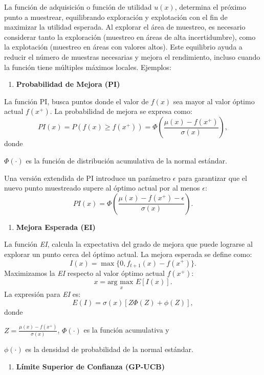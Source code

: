 \documentclass[
  12pt,
  letterpaper,
  DIV=11,
  numbers=noendperiod]{scrartcl}
\providecommand{\tightlist}{%
  \setlength{\itemsep}{0pt}\setlength{\parskip}{0pt}}\usepackage{longtable,booktabs,array}
\begin{document}
La función de adquisición o función de utilidad \(u(x)\), determina el
próximo punto a muestrear, equilibrando exploración y explotación con el
fin de maximizar la utilidad esperada. Al explorar el área de muestreo,
es necesario considerar tanto la exploración (muestreo en áreas de alta
incertidumbre), como la explotación (muestreo en áreas con valores
altos). Este equilibrio ayuda a reducir el número de muestras necesarias
y mejora el rendimiento, incluso cuando la función tiene múltiples
máximos locales. Ejemplos:

\newpage

\begin{enumerate}
\def\labelenumi{\arabic{enumi}.}
\tightlist
\item
  \textbf{Probabilidad de Mejora (PI)}
\end{enumerate}

La función PI, busca puntos donde el valor de \(f(x)\) sea mayor al
valor óptimo actual \(f(x^+)\). La probabilidad de mejora se expresa
como: \[
PI(x) = P(f(x) \geq f(x^+)) = \Phi\left(\frac{\mu(x) - f(x^+)}{\sigma(x)}\right),
\] donde

\(\Phi(\cdot)\) es la función de distribución acumulativa de la normal
estándar.

Una versión extendida de PI introduce un parámetro \(\epsilon\) para
garantizar que el nuevo punto muestreado supere al óptimo actual por al
menos \(\epsilon\): \[
PI(x) = \Phi\left(\frac{\mu(x) - f(x^+) - \epsilon}{\sigma(x)}\right).
\]

\begin{enumerate}
\def\labelenumi{\arabic{enumi}.}
\setcounter{enumi}{1}
\tightlist
\item
  \textbf{Mejora Esperada (EI)}
\end{enumerate}

La función \emph{EI}, calcula la expectativa del grado de mejora que
puede lograrse al explorar un punto cerca del óptimo actual. La mejora
esperada se define como: \[
I(x) = \max\{0, f_{t+1}(x) - f(x^+)\}.
\] Maximizamos la \emph{EI} respecto al valor óptimo actual \(f(x^+)\):
\[
x = \underset{x}{\text{arg max }} E[I(x)].
\] La expresión para \emph{EI} es: \[
E(I) = \sigma(x) \left[ Z \Phi(Z) + \phi(Z) \right],
\] donde

\(Z = \frac{\mu(x) - f(x^+)}{\sigma(x)}\), \(\Phi(\cdot)\) es la función
acumulativa y

\(\phi(\cdot)\) es la densidad de probabilidad de la normal estándar.

\begin{enumerate}
\def\labelenumi{\arabic{enumi}.}
\setcounter{enumi}{2}
\tightlist
\item
  \textbf{Límite Superior de Confianza (GP-UCB)}
\end{enumerate}
\end{document}
